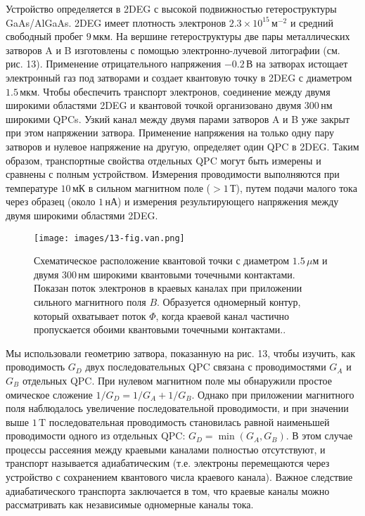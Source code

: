 \documentclass[a4paper,14pt]{extarticle}
\begin{document}
Устройство определяется в 2DEG с высокой подвижностью гетероструктуры GaAs/AlGaAs. 2DEG имеет плотность электронов $2.3 \times 10^{15} \, \text{м}^{-2}$ и средний свободный пробег $9 \, \text{мкм}$. На вершине гетероструктуры две пары металлических затворов A и B изготовлены с помощью электронно-лучевой литографии (см. рис. 13). Применение отрицательного напряжения $-0.2 \, \text{В}$ на затворах истощает электронный газ под затворами и создает квантовую точку в 2DEG с диаметром $1.5 \, \text{мкм}$. Чтобы обеспечить транспорт электронов, соединение между двумя широкими областями 2DEG и квантовой точкой организовано двумя $300 \, \text{нм}$ широкими QPCs. Узкий канал между двумя парами затворов A и B уже закрыт при этом напряжении затвора. Применение напряжения на только одну пару затворов и нулевое напряжение на другую, определяет один QPC в 2DEG. Таким образом, транспортные свойства отдельных QPC могут быть измерены и сравнены с полным устройством. Измерения проводимости выполняются при температуре $10 \, \text{мК}$ в сильном магнитном поле ($>1 \, \text{Т}$), путем подачи малого тока через образец (около $1 \, \text{нА}$) и измерения результирующего напряжения между двумя широкими областями 2DEG.

\begin{figure}[htbp]
    \centering
    \texttt{[image: images/13-fig.van.png]}
    \caption{\label{fig:van2} Схематическое расположение квантовой точки с диаметром $1.5 \, \mu \text{м}$ и двумя $300 \, \text{нм}$ широкими квантовыми точечными контактами. Показан поток электронов в краевых каналах при приложении сильного магнитного поля $B$. Образуется одномерный контур, который охватывает поток $\Phi$, когда краевой канал частично пропускается обоими квантовыми точечными контактами.\cite{van}.}
\end{figure}

Мы использовали геометрию затвора, показанную на рис. 13, чтобы изучить, как проводимость $G_D$ двух последовательных QPC связана с проводимостями $G_A$ и $G_B$ отдельных QPC. При нулевом магнитном поле мы обнаружили простое омическое сложение $1/G_D = 1/G_A + 1/G_B$. Однако при приложении магнитного поля наблюдалось увеличение последовательной проводимости, и при значении выше $1 \, \text{T}$ последовательная проводимость становилась равной наименьшей проводимости одного из отдельных QPC: $G_D = \min(G_A, G_B)$. В этом случае процессы рассеяния между краевыми каналами полностью отсутствуют, и транспорт называется адиабатическим (т.е. электроны перемещаются через устройство с сохранением квантового числа краевого канала). Важное следствие адиабатического транспорта заключается в том, что краевые каналы можно рассматривать как независимые одномерные каналы тока.
\end{document}

